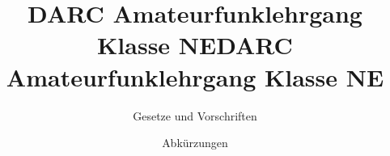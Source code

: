 \documentclass[aspectratio = 169]{beamer}
\begin{document}
\title{DARC Amateurfunklehrgang Klasse NE}
\author{Gesetze und Vorschriften}
\begin{frame}
\maketitle
\end{frame}










\title{DARC Amateurfunklehrgang Klasse NE}
\author{Abkürzungen}
\begin{frame}
\maketitle
\end{frame}



\end{document}
